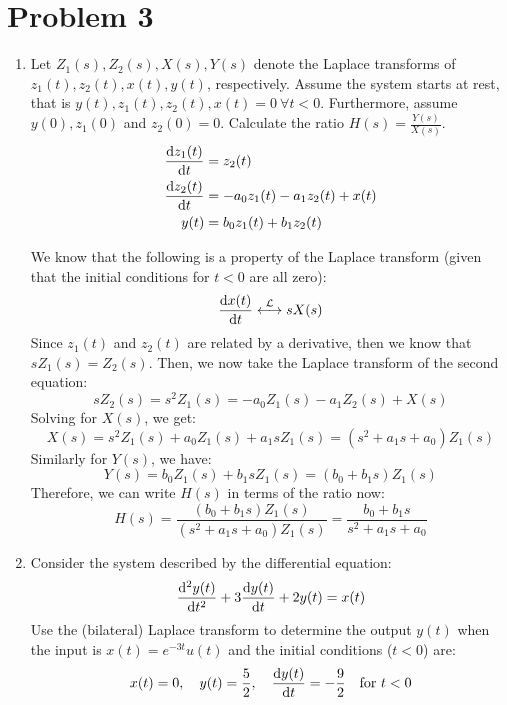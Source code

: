 \documentclass[10pt]{article}
\begin{document}
	\section*{Problem 3}
	\begin{enumerate}[label=\alph*)]
		\item Let \( Z_1(s), Z_2(s), X(s), Y(s) \) denote the Laplace transforms of \( z_1(t), z_2(t), x(t), y(t) \), 
			respectively. Assume the system starts at rest, that is \( y(t), z_1(t), z_2(t), x(t) = 0
			\ \forall  t < 0\). Furthermore, assume \( y(0), z_1(0) \) and \( z_2(0) = 0 \). 
			Calculate the ratio \( H(s) = \frac{Y(s)}{X(s)} \). 
			\begin{align*}
				\dv{z_1(t)}{t} &= z_2(t) \\
				\dv{z_2(t)}{t} &= -a_0z_1(t) - a_1z_2(t) + x(t) \\
				y(t) &=  b_0z_1(t) + b_1z_2(t) 
			\end{align*}

			\begin{solution}
				We know that the following is a property of the Laplace transform (given that the initial 
				conditions for \( t < 0 \) are all zero):
				\[
					\dv{x(t)}{t} \overset{\mathcal L}{\longleftrightarrow} s X(s)
				\] 
				Since \( z_1(t) \) and \( z_2(t) \) are related by a derivative, then we know that 
				\( s Z_1(s) = Z_2(s) \). Then, we now take the Laplace transform of the second equation:
				\[
				s Z_2(s) = s^2 Z_1(s) = -a_0Z_1(s) - a_1Z_2(s) + X(s)
				\] 
				Solving for \( X(s) \), we get:
				\[
				X(s) = s^2Z_1(s) + a_0Z_1(s) + a_1s Z_1(s) = (s^2 + a_1s + a_0) Z_1(s) 
				\] 
				Similarly for \( Y(s) \), we have:
				\[
				Y(s) = b_0Z_1(s) + b_1s Z_1(s) = (b_0 + b_1s)Z_1(s)
				\] 
				Therefore, we can write \( H(s) \) in terms of the ratio now:
				\[
					H(s) = \frac{(b_0 + b_1s)Z_1(s)}{(s^2 + a_1s + a_0)Z_1(s)} = \frac{b_0 + b_1s}{s^2 + a_1s + a_0}
				\] 
			\end{solution}
		\item Consider the system described by the differential equation:
			\[
				\dv[2]{y(t)}{t} + 3\dv{y(t)}{t} + 2y(t) = x(t)
			\] 
			Use the (bilateral) Laplace transform to determine the output \( y(t) \) when the input 
			is \( x(t) = e^{-3t}u(t) \) and the initial conditions (\( t < 0 \)) are:
			\[
				x(t) = 0, \quad y(t) = \frac{5}{2}, \quad \dv{y(t)}{t} = -\frac{9}{2} \quad \text{for \( t < 0 \)}
			\] 


\end{enumerate}
\end{document}
